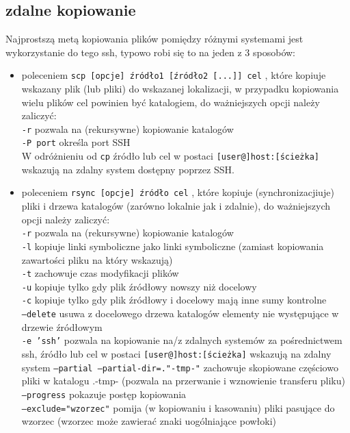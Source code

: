 \documentclass{pdfBooklets}
\begin{document}
\subsection{zdalne kopiowanie}
Najprostszą metą kopiowania plików pomiędzy różnymi systemami jest wykorzystanie do tego ssh, typowo robi się to na jeden z 3 sposobów:
\begin{itemize}
	\item poleceniem
		\texttt{scp [opcje] źródło1 [źródło2 [...]] cel}
		, które
		kopiuje wskazany plik (lub pliki) do wskazanej lokalizacji, w przypadku kopiowania wielu plików cel powinien być katalogiem, do ważniejszych opcji należy zaliczyć:\\
		\texttt{-r} pozwala na (rekursywne) kopiowanie katalogów\\
		\texttt{-P port} określa port SSH\\
		W odróżnieniu od \texttt{cp} źródło lub cel w postaci \texttt{[user@]host:[ścieżka]} wskazują na zdalny system dostępny poprzez SSH.
	\item poleceniem
		\texttt{rsync [opcje] źródło cel}
		, które
		kopiuje (synchronizacjiuje) pliki i drzewa katalogów (zarówno lokalnie jak i zdalnie), do ważniejszych opcji należy zaliczyć:\\
			\texttt{-r} pozwala na (rekursywne) kopiowanie katalogów\\
			\texttt{-l} kopiuje linki symboliczne jako linki symboliczne (zamiast kopiowania zawartości pliku na który wskazują)\\
			\texttt{-t} zachowuje czas modyfikacji plików\\
			\texttt{-u} kopiuje tylko gdy plik źródłowy nowszy niż docelowy\\
			\texttt{-c} kopiuje tylko gdy plik źródłowy i docelowy mają inne sumy kontrolne\\
			\texttt{--delete} usuwa z docelowego drzewa katalogów elementy nie występujące w drzewie źródłowym\vspace{6pt}\\
			\texttt{-e 'ssh'} pozwala na kopiowanie na/z zdalnych systemów za pośrednictwem ssh, źródło lub cel w postaci \texttt{[user@]host:[ścieżka]} wskazują na zdalny system
			\texttt{--partial --partial-dir=."-tmp-"} zachowuje skopiowane częściowo pliki w katalogu .-tmp- (pozwala na przerwanie i wznowienie transferu pliku)\\
			\texttt{--progress} pokazuje postęp kopiowania\\
			\texttt{--exclude="wzorzec"} pomija (w kopiowaniu i kasowaniu) pliki pasujące do wzorzec (wzorzec może zawierać znaki uogólniające powłoki)

\end{itemize}
\end{document}

